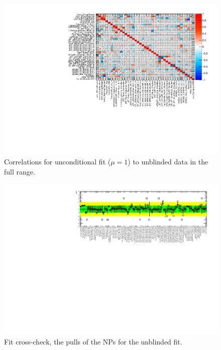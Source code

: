 \begin{figure}[ht]
      \centering
        \includegraphics[width=\linewidth]{figures/Fit_fcc/GlobalFit/corr_HighCorrNoMCStat.pdf}
        \caption{Correlations for unconditional fit ($\mu=1$) to unblinded data in the full range.}
       \label{fig:fit_1lep_corr_all_data}
\end{figure}

\begin{figure}[ht]
      \centering
        \includegraphics[width=\linewidth]{figures/Fit_fcc/GlobalFit/NP_allExceptGammas.pdf}
        \caption{Fit cross-check, the pulls of the NPs for the unblinded fit.}
       \label{fig:fit_1lep_fcc_data}
\end{figure}

